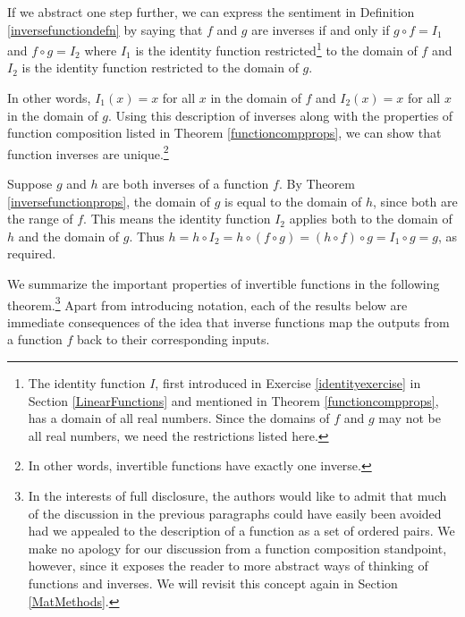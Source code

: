 \documentclass{ximera}
\begin{document}
If we abstract one step further, we can express the sentiment in Definition \ref{inversefunctiondefn} by saying that $f$ and $g$ are inverses if and only if  $g \circ f = I_{1}$ and $f \circ g = I_{2}$ where $I_{1}$ is the identity function restricted\footnote{The identity function $I$, first introduced in Exercise \ref{identityexercise} in Section \ref{LinearFunctions} and mentioned in Theorem \ref{functioncompprops}, has a domain of all real numbers.  Since the domains of $f$ and $g$ may not be all real numbers, we need the restrictions listed here.} to the domain of $f$ and $I_{2}$ is the identity function restricted to the domain of $g$.  

In other words, $I_{1}(x) = x$ for all $x$ in the domain of $f$ and $I_{2}(x) = x$ for all $x$ in the domain of $g$.    Using this description of inverses along with the properties of function composition listed in Theorem  \ref{functioncompprops}, we can show that function inverses are unique.\footnote{In other words, invertible functions have exactly one inverse.}   

Suppose $g$ and $h$ are both inverses of a function $f$. By Theorem \ref{inversefunctionprops}, the domain of $g$ is equal to the domain of $h$, since both are the range of $f$.  This means the identity function $I_{2}$ applies both to the domain of $h$ and the domain of $g$.  Thus $h = h \circ I_{2} = h \circ (f \circ g) = (h \circ f) \circ g = I_{1} \circ g = g$, as required.

We summarize the important properties of invertible functions in the following theorem.\footnote{In the interests of full disclosure, the authors would like to admit that much of the discussion in the previous paragraphs could have easily been avoided had we appealed to the description of a function as a set of ordered pairs.  We make no apology for our discussion from a function composition standpoint, however, since it exposes the reader to more abstract ways of thinking of functions and inverses.  We will revisit this concept again in Section \ref{MatMethods}.}  Apart from introducing notation, each of the results below are immediate consequences of the idea that inverse functions map the outputs from a function $f$  back to their corresponding inputs.

\end{document}
